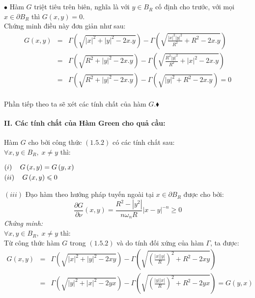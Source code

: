 \\ \\$\bullet$ Hàm $G$ triệt tiêu trên biên, nghĩa là với $
y \in B_R 
$ cố định cho trước, với mọi $
x \in \partial B_R 
$ thì $
G\left( {x,y} \right) = 0
$.\\
Chứng minh điều này đơn giản như sau:
\begin{eqnarray}
G\left( {x,y} \right) &=& \Gamma \left( {\sqrt {\left| x \right|^2  + \left| y \right|^2  - 2x.y} } \right) - \Gamma \left( {\sqrt {\frac{{\left| x \right|^2 \left| y \right|^2 }}
{{R^2 }} + R^2  - 2x.y} } \right)\nonumber\\
& = &\Gamma \left( {\sqrt {R^2  + \left| y \right|^2  - 2x.y} } \right) - \Gamma \left( {\sqrt {\frac{{R^2 \left| y \right|^2 }}
{{R^2 }} + \left| x \right|^2  - 2x.y} } \right)\nonumber\\
 &= &\Gamma \left( {\sqrt {R^2  + \left| y \right|^2  - 2x.y} } \right) - \Gamma \left( {\sqrt {\left| y \right|^2  + R^2  - 2x.y} } \right) = 0\nonumber
\end{eqnarray}
\\ Phần tiếp theo ta sẽ xét các tính chất của hàm $G$.$\blacklozenge$\\
\\
\textbf{II. Các tính chất của Hàm Green cho quả cầu:} \\
\\Hàm $G$ cho bởi công thức $
\left( {1.5.2} \right)
$ có các tính chất sau:\\
$
\forall x,y \in B_R ,\;x \ne y
$ thì:
\begin{flushleft}
$\begin{gathered}
  \left( i \right)\quad G\left( {x,y} \right) = G\left( {y,x} \right) \hfill \\
  \left( {ii} \right)\quad G\left( {x,y} \right) \leqslant 0 \hfill \\ 
\end{gathered} 
$\\\end{flushleft}
$
\left( {iii} \right)$
Đạo hàm theo hướng pháp tuyến ngoài tại $
x \in \partial B_R $ được cho bởi:
\[
\frac{{\partial G}}
{{\partial \nu }}\left( {x,y} \right) = \frac{{R^2  - \left| {y^2 } \right|}}
{{n\omega _n R}}\left| {x - y} \right|^{ - n}  \geqslant 0
\]
{\it Chứng minh:}\\
$
\forall x,y \in B_R ,\;x \ne y
$ thì:\\
Từ công thức hàm $G$ trong $
\left( {1.5.2} \right)
$ và do tính đối xứng của hàm $\Gamma$, ta được:
\begin{eqnarray}
G\left( {x,y} \right) &=& \Gamma \left( {\sqrt {\left| x \right|^2  + \left| y \right|^2  - 2xy} } \right) - \Gamma \left( {\sqrt {\left( {\frac{{\left| x \right|\left| y \right|}}
{R}} \right)^2  + R^2  - 2xy} } \right)\nonumber\\
 &=& \Gamma \left( {\sqrt {\left| y \right|^2  + \left| x \right|^2  - 2yx} } \right) - \Gamma \left( {\sqrt {\left( {\frac{{\left| y \right|\left| x \right|}}
{R}} \right)^2  + R^2  - 2yx} } \right) = G\left( {y,x} \right)\nonumber
\end{eqnarray}
